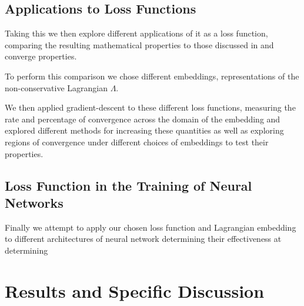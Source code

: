 \documentclass[10pt]{iopart}
\begin{document}
\subsection{Applications to Loss Functions}

Taking this \updimpl{} we then explore different applications of it as a loss function, comparing the resulting mathematical properties to those discussed in  and converge properties.

To perform this comparison we chose different embeddings, representations of the non-conservative Lagrangian $\Lambda$.

We then applied gradient-descent\cite{gradientDescent} to these different loss functions, measuring the rate and percentage of convergence across the domain of the embedding and explored different methods for increasing these quantities as well as exploring regions of convergence under different choices of embeddings to test their properties.




\subsection{Loss Function in the Training of Neural Networks}

Finally we attempt to apply our chosen loss function and Lagrangian embedding to different architectures of neural network determining their effectiveness at determining

\section{Results and Specific Discussion}
\end{document}
